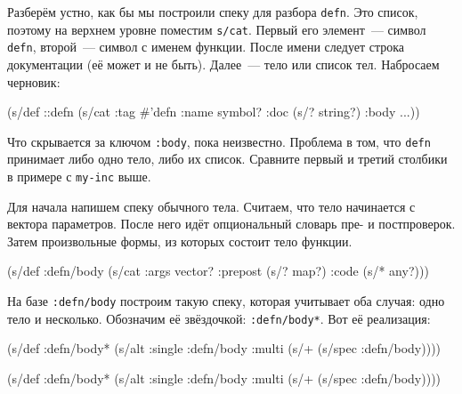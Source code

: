 
Разберём устно, как бы мы построили спеку для разбора \verb|defn|. Это список,
поэтому на верхнем уровне поместим \verb|s/cat|. Первый его элемент~--- символ
\verb|defn|, второй~--- символ с именем функции. После имени следует строка
документации (её может и не быть). Далее~--- тело или список тел. Набросаем
черновик:

\begin{english}
  \begin{clojure}
(s/def ::defn
  (s/cat :tag #{'defn}
         :name symbol?
         :doc (s/? string?)
         :body ...))
  \end{clojure}
\end{english}

Что скрывается за ключом \verb|:body|, пока неизвестно. Проблема в том, что
\verb|defn| принимает либо одно тело, либо их список. Сравните первый и третий
столбики в примере с \verb|my-inc| выше.

Для начала напишем спеку обычного тела. Считаем, что тело начинается с вектора
параметров. После него идёт опциональный словарь пре- и постпроверок. Затем
произвольные формы, из которых состоит тело функции.

\begin{english}
  \begin{clojure}
(s/def :defn/body
  (s/cat :args vector?
         :prepost (s/? map?)
         :code (s/* any?)))
  \end{clojure}
\end{english}

На базе \verb|:defn/body| построим такую спеку, которая учитывает оба случая:
одно тело и несколько. Обозначим её звёздочкой: \verb|:defn/body*|. Вот её
реализация:

\ifx\DEVICETYPE\MOBILE

\begin{english}
  \begin{clojure}
(s/def :defn/body*
  (s/alt :single :defn/body
         :multi (s/+
                  (s/spec :defn/body))))
  \end{clojure}
\end{english}

\else

\begin{english}
  \begin{clojure}
(s/def :defn/body*
  (s/alt :single :defn/body
         :multi (s/+ (s/spec :defn/body))))
  \end{clojure}
\end{english}

